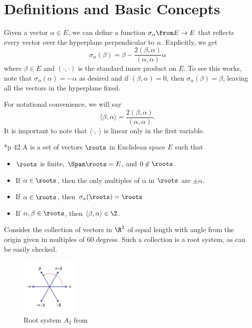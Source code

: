 \documentclass[11pt,leqno,oneside]{amsart}
\numberwithin{thm}{section}
\begin{document}
\section{Definitions and Basic Concepts}
Given a vector $\alpha \in E$, we can define a function $\sigma_\alpha \from E
\to E$ that reflects every vector over the hyperplane perpendicular to
$\alpha$. Explicitly, we get \[
  \sigma_\alpha(\beta) = \beta -
  \frac{2(\beta,\alpha)}{(\alpha,\alpha)} \alpha
\]
where $\beta \in E$ and $(\cdot,\cdot)$ is the standard inner product
on $E$. To see this works, note that $\sigma_\alpha(\alpha) = -\alpha$
as desired and if $(\beta,\alpha) = 0$, then $\sigma_\alpha(\beta) =
\beta$, leaving all the vectors in the hyperplane fixed.
\begin{defn}
  For notational convenience, we will say \[
    \langle \beta, \alpha \rangle = \frac{2(\beta,\alpha)}{(\alpha,\alpha)}.
  \]
  It is important to note that $\langle \cdot, \cdot \rangle$ is
  linear only in the first variable.
\end{defn}
\begin{defn}
  \cite{humph}*{p 42} A  is a set of vectors $\roots$ in
  Euclidean space $E$
  such that
  \begin{itemize}
  \item $\roots$ is finite, $\Span \roots = E$, and $0 \not \in \roots$.
  \item If $\alpha \in \roots$, then the only multiples of $\alpha$ in
    $\roots$ are $\pm \alpha$.
  \item If $\alpha \in \roots$, then $\sigma_\alpha(\roots) = \roots$
  \item If $\alpha,\beta \in \roots$, then $\langle  \beta,\alpha
    \rangle \in \Z$.
  \end{itemize}
\end{defn}
\begin{example}
  Consider the collection of vectors in $\R^2$ of equal length with
  angle from 
  the origin given in multiples of 60 degress. Such a collection is a
  root system, as can be easily checked.
  \begin{figure}[h]
    \centering
    \includegraphics[width=0.25\textwidth]{images/Root_system_A2_with_labels.png}
    \caption{Root system $A_2$ from \cite{wiki}}
  \end{figure}
\end{example}
\end{document}
